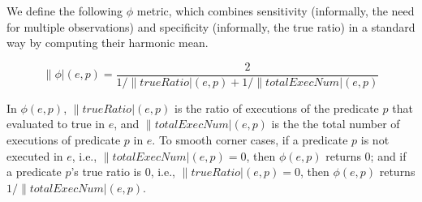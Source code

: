 % 
% 
% 
% 

We define the following
$\phi$ metric, which
combines sensitivity (informally, the need for multiple observations) and
specificity (informally, the true ratio) in a standard way by computing their
harmonic mean.

\vspace{-4mm}

{\small{
\[
\|\phi|(e, p) = \frac{2}{{1}/{\|trueRatio|(e, p)} + {1}/{\|totalExecNum|(e, p)}}
\]
}}

\vspace{-3mm}

In $\phi(e, p)$, $\|trueRatio|(e, p)$ is the ratio of executions of the predicate $p$ that
evaluated to true in $e$, and $\|totalExecNum|(e, p)$ is the the total
number of executions of predicate $p$ in $e$.
To smooth corner cases, if a predicate $p$ is not executed in $e$, i.e., 
$\|totalExecNum|(e, p) = 0$, then $\phi(e, p)$ returns 0; and if a predicate $p$'s true ratio is 0, i.e., $\|trueRatio|(e, p) = 0$, then $\phi(e, p)$ returns
$1/\|totalExecNum|(e, p)$.


